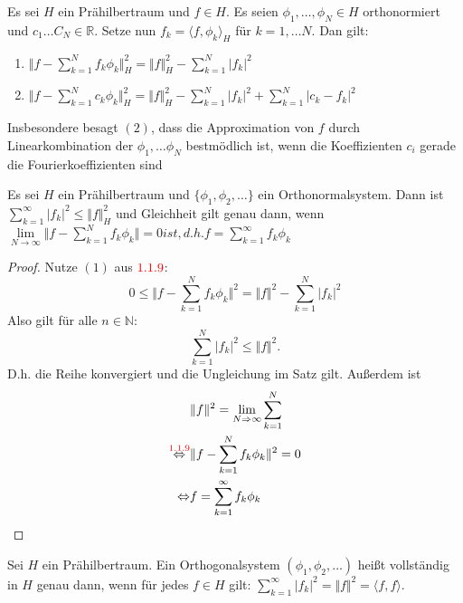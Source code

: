 \documentclass[12pt,titlepage]{article}
\begin{document}
 \begin{satz}
 Es sei $H$ ein Prähilbertraum und $f \in H$. Es seien $\phi_1,\ldots,\phi_N \in H$ orthonormiert und $c_1 \ldots C_N \in \mathbb{R}$. Setze nun $f_k=\langle f, \phi_k\rangle_H$ für $k=1,\ldots N$. Dan gilt:
 \begin{enumerate}
 \item $\Vert f- \sum_{k=1}^Nf_k\phi_k\Vert_H^2=\Vert f\Vert_H^2- \sum_{k=1}^N \vert f_k\vert^2$
 \item $\Vert f- \sum_{k=1}^Nc_k\phi_k\Vert_H^2=\Vert f\Vert_{H}^2-\sum_{k=1}^N \vert f_k\vert^2+\sum_{k=1}^N \vert c_k- f_k\vert^2$
 \end{enumerate}
 \end{satz}
 \begin{bemerkung}
 Insbesondere besagt $(2)$, dass die Approximation von $f$ durch Linearkombination der $\phi_1, \ldots \phi_N$ bestmödlich ist, wenn die Koeffizienten $c_i$ gerade die Fourierkoeffizienten sind
  \end{bemerkung}
  \begin{satz}
  Es sei $H$ ein Prähilbertraum und $\{\phi_1,\phi_2, \ldots\}$ ein Orthonormalsystem. Dann ist $\sum_{k=1}^{\infty} \vert f_k \vert^2 \leq \Vert f \Vert_H^2$ und Gleichheit gilt genau dann, wenn $\underset{N\rightarrow \infty}{\lim}\Vert f-\sum_{k=1}^{N}f_k \phi_k\Vert=0 ist, d.h. f= \sum_{k=1}^{\infty}f_k \phi_k$
  \end{satz}
  \begin{proof}
  Nutze $(1)$ aus $\textcolor{red}{1.1.9}$:
  \[
0\leq   \Vert f- \sum_{k=1}^N f_k\phi_k\Vert^2= \Vert f \Vert^2-\sum_{k=1}^{N} \vert f_k \vert^2
  \]
  Also gilt für alle $n \in \mathbb{N}:$
  \[
  \sum_{k=1}^{N} \vert f_k \vert^2 \leq \Vert f \Vert^2.
  \]
  D.h. die Reihe konvergiert und die Ungleichung im Satz gilt. Außerdem ist \begin{align*}
  &\Vert f \Vert^2=\underset{N \Rightarrow \infty}{\lim}\sum_{k=1}^N\\
  \overset{\textcolor{red}{1.1.9}}{\Leftrightarrow}& \Vert f- \sum_{k=1}^Nf_k\phi_k \Vert^2=0\\
 \Leftrightarrow &f=\sum_{k=1}^{\infty}f_k\phi_k
  \end{align*}
   \end{proof}
 \begin{definition}
 Sei $H$ ein Prähilbertraum. Ein Orthogonalsystem $(\phi_1,\phi_2, \ldots)$ heißt vollständig in $H$ genau dann, wenn für jedes $f \in H$ gilt: $\sum_{k=1}^{\infty}\vert f_k\vert^2=\Vert f \Vert^2=\langle f,f \rangle.$
 \end{definition}
\end{document}
